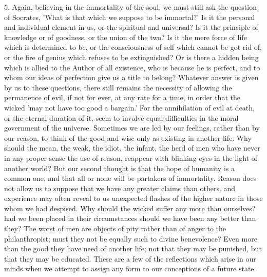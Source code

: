 5. Again, believing in the immortality of the soul, we must still ask the
question of Socrates, 'What is that which we suppose to be immortal?' Is
it the personal and individual element in us, or the spiritual and
universal? Is it the principle of knowledge or of goodness, or the union
of the two? Is it the mere force of life which is determined to be, or the
consciousness of self which cannot be got rid of, or the fire of genius
which refuses to be extinguished? Or is there a hidden being which is
allied to the Author of all existence, who is because he is perfect, and
to whom our ideas of perfection give us a title to belong? Whatever answer
is given by us to these questions, there still remains the necessity of
allowing the permanence of evil, if not for ever, at any rate for a time,
in order that the wicked 'may not have too good a bargain.' For the
annihilation of evil at death, or the eternal duration of it, seem to
involve equal difficulties in the moral government of the universe.
Sometimes we are led by our feelings, rather than by our reason, to think
of the good and wise only as existing in another life. Why should the
mean, the weak, the idiot, the infant, the herd of men who have never in
any proper sense the use of reason, reappear with blinking eyes in the
light of another world? But our second thought is that the hope of
humanity is a common one, and that all or none will be partakers of
immortality. Reason does not allow us to suppose that we have any greater
claims than others, and experience may often reveal to us unexpected
flashes of the higher nature in those whom we had despised. Why should the
wicked suffer any more than ourselves? had we been placed in their
circumstances should we have been any better than they? The worst of men
are objects of pity rather than of anger to the philanthropist; must they
not be equally such to divine benevolence? Even more than the good they
have need of another life; not that they may be punished, but that they
may be educated. These are a few of the reflections which arise in our
minds when we attempt to assign any form to our conceptions of a future
state.

